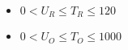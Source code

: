 \begin{itemize}
\tightlist
\item $0 < U_R\le T_R \le 120$
\item $0 < U_O\le T_O \le 1000$
\end{itemize}
